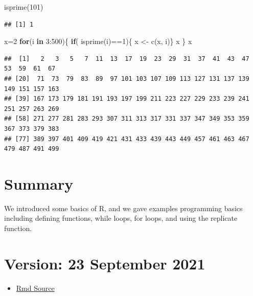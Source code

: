 \documentclass[
]{article}
\newenvironment{Shaded}{\begin{snugshade}}{\end{snugshade}}
\newcommand{\ControlFlowTok}[1]{\textcolor[rgb]{0.13,0.29,0.53}{\textbf{#1}}}
\newcommand{\DecValTok}[1]{\textcolor[rgb]{0.00,0.00,0.81}{#1}}
\newcommand{\FunctionTok}[1]{\textcolor[rgb]{0.00,0.00,0.00}{#1}}
\newcommand{\NormalTok}[1]{#1}
\newcommand{\OtherTok}[1]{\textcolor[rgb]{0.56,0.35,0.01}{#1}}
\newcommand{\SpecialCharTok}[1]{\textcolor[rgb]{0.00,0.00,0.00}{#1}}
\providecommand{\tightlist}{%
  \setlength{\itemsep}{0pt}\setlength{\parskip}{0pt}}
\theoremstyle{definition}
\theoremstyle{definition}
\theoremstyle{definition}
\theoremstyle{remark}
\begin{document}
\begin{Shaded}
\begin{Highlighting}[]
\FunctionTok{isprime}\NormalTok{(}\DecValTok{101}\NormalTok{)}
\end{Highlighting}
\end{Shaded}

\begin{verbatim}
## [1] 1
\end{verbatim}

\begin{Shaded}
\begin{Highlighting}[]
\NormalTok{x}\OtherTok{=}\DecValTok{2}
 \ControlFlowTok{for}\NormalTok{(i }\ControlFlowTok{in} \DecValTok{3}\SpecialCharTok{:}\DecValTok{500}\NormalTok{)\{}
\ControlFlowTok{if}\NormalTok{( }\FunctionTok{isprime}\NormalTok{(i)}\SpecialCharTok{==}\DecValTok{1}\NormalTok{)\{}
\NormalTok{x }\OtherTok{\textless{}{-}} \FunctionTok{c}\NormalTok{(x, i)\}}
\NormalTok{ x}
\NormalTok{\}}
\NormalTok{x}
\end{Highlighting}
\end{Shaded}

\begin{verbatim}
##  [1]   2   3   5   7  11  13  17  19  23  29  31  37  41  43  47  53  59  61  67
## [20]  71  73  79  83  89  97 101 103 107 109 113 127 131 137 139 149 151 157 163
## [39] 167 173 179 181 191 193 197 199 211 223 227 229 233 239 241 251 257 263 269
## [58] 271 277 281 283 293 307 311 313 317 331 337 347 349 353 359 367 373 379 383
## [77] 389 397 401 409 419 421 431 433 439 443 449 457 461 463 467 479 487 491 499
\end{verbatim}

\hypertarget{summary}{%
\section{Summary}\label{summary}}

We introduced some basics of R, and we gave examples programming basics including defining functions, while loops, for loops, and using the replicate function.

\hypertarget{version-23-september-2021}{%
\section{Version: 23 September 2021}\label{version-23-september-2021}}

\begin{itemize}
\tightlist
\item
  \href{https://tsoo-math.github.io/ucl/intro-R.Rmd}{Rmd Source}
\end{itemize}
\end{document}
